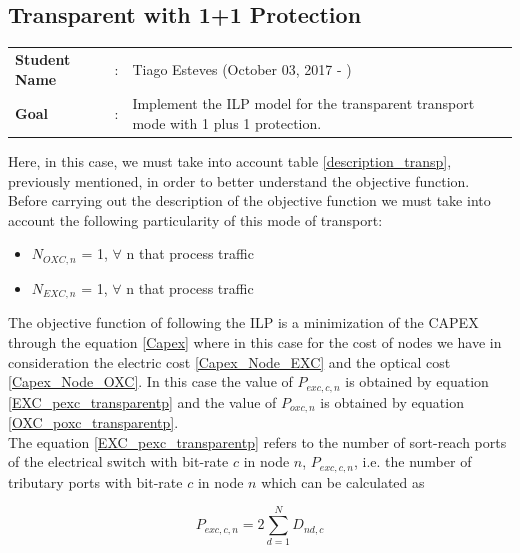 \clearpage

\subsection{Transparent with 1+1 Protection}\label{ILP_Transp_Protection}
\begin{tcolorbox}	
\begin{tabular}{p{2.75cm} p{0.2cm} p{10.5cm}} 	
\textbf{Student Name}  &:& Tiago Esteves    (October 03, 2017 - )\\
\textbf{Goal}          &:& Implement the ILP model for the transparent transport mode with 1 plus 1 protection.
\end{tabular}
\end{tcolorbox}
\vspace{11pt}

Here, in this case, we must take into account table \ref{description_transp}, previously mentioned, in order to better understand the objective function.\\

Before carrying out the description of the objective function we must take into account the following particularity of this mode of transport:
\begin{itemize}
  \item $N_{OXC,n}$ = 1, \quad $\forall$ n that process traffic
  \item $N_{EXC,n}$ = 1, \quad $\forall$ n that process traffic
\end{itemize}

\vspace{11pt}
The objective function of following the ILP is a minimization of the CAPEX through the equation \ref{Capex} where in this case for the cost of nodes we have in consideration the electric cost \ref{Capex_Node_EXC} and the optical cost \ref{Capex_Node_OXC}.
In this case the value of $P_{exc,c,n}$ is obtained by equation \ref{EXC_pexc_transparentp} and the value of $P_{oxc,n}$ is obtained by equation \ref{OXC_poxc_transparentp}.\\

The equation \ref{EXC_pexc_transparentp} refers to the number of sort-reach ports of the electrical switch with bit-rate $c$ in node $n$, $P_{exc,c,n}$, i.e. the number of tributary ports with bit-rate $c$ in node $n$ which can be calculated as

\begin{equation}
P_{exc,c,n} = 2 \sum_{d=1}^{N} D_{nd,c}
\label{EXC_pexc_transparentp}
\end{equation}

